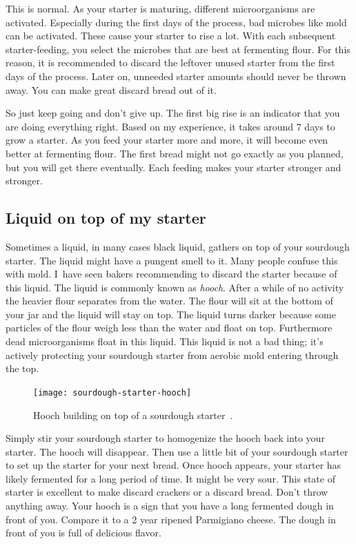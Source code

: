 This is normal. As your starter is maturing, different
microorganisms are activated. Especially during
the first days of the process, bad microbes
like mold can be activated. These cause your
starter to rise a lot. With each subsequent
starter-feeding, you select the microbes that are best
at fermenting flour. For this reason, it is
recommended to discard the leftover unused starter
from the first days of the process. Later on, unneeded
starter amounts should never be thrown away. You can make
great discard bread out of it.

So just keep going and don't give up. The first big
rise is an indicator that you are doing everything
right. Based on my experience, it takes around 7
days to grow a starter. As you feed your starter
more and more, it will become even better at fermenting
flour. The first bread might not go exactly as you
planned, but you will get there eventually. Each
feeding makes your starter stronger and stronger.

\subsection{Liquid on top of my starter}

Sometimes a liquid, in many cases black liquid, gathers on top
of your sourdough starter. The liquid might have a pungent
smell to it. Many people confuse this with mold. I~have seen
bakers recommending to discard the starter because of this liquid.
The liquid is commonly known as \emph{hooch}. After a while
of no activity the heavier flour separates from the water. The flour
will sit at the bottom of your jar and the liquid will stay on top.
The liquid turns darker because some particles of the flour weigh
less than the water and float on top. Furthermore dead microorganisms
float in this liquid. This liquid is not a bad thing; it's actively
protecting your sourdough starter from aerobic mold entering through
the top.

\begin{figure}[!htb]
  \centering
  \texttt{[image: sourdough-starter-hooch]}
  \caption[Hooch] {Hooch building on top of a sourdough
      starter~\cite{liquid+on+starter}.}%
  \label{fig:hooch}
\end{figure}

Simply stir your sourdough starter to homogenize the hooch back
into your starter. The hooch will disappear. Then use a little bit of
your sourdough starter to set up the starter for your next bread.
Once hooch appears, your starter has likely fermented for a long
period of time. It might be very sour. This state of starter
is excellent to make discard crackers or a discard bread. Don't throw
anything away. Your hooch is a sign that you have a long fermented
dough in front of you. Compare it to a 2 year ripened Parmigiano cheese.
The dough in front of you is full of delicious flavor.

